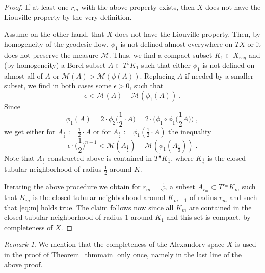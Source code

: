 \documentclass[12pt,leqno]{amsart}
\numberwithin{equation}{section}
\theoremstyle{definition}
\theoremstyle{remark}
\newtheorem{rem}[thm]{Remark}
\newcommand{\tref}[1]{Theorem~\ref{#1}}
\begin{document}
\begin{proof}
If at least one $r_m$ with the above property exists, then $X$  does not have the Liouville property by the very definition.

Assume on the other hand, that $X$ does not have the Liouville property. Then,  by homogeneity of the geodesic flow,  $\phi _1$ is not defined almost everywhere on $TX$ or it does not preserve the measure $\mathcal M$. Thus, we find a compact subset $K_1\subset X_{reg}$ and (by homogeneity) a Borel subset $A\subset T^1 K_1$ such that either $\phi_1$ is not defined on almost all of $A$ or $\mathcal M (A) > \mathcal M(\phi (A))$.  Replacing $A$
if needed by a smaller  subset, we find in both cases some $\epsilon >0$, such that   $$\epsilon < \mathcal M (A) - \mathcal M(\phi_1 (A)) \; .$$
Since $$\phi_1 (A)=2\cdot \phi _2 \Big (\frac 1 2 \cdot A \Big)=2\cdot \Big(\phi _1 \circ \phi_1 \Big (\frac 1 2 A \Big ) \Big ) \; ,$$
we get either for $A_{\frac 1 2} := \frac 1 2  \cdot A$ or for $A_{\frac 1 2} := \phi_1 (\frac 1 2 \cdot A)$ the inequality
$$\epsilon \cdot \Big(\frac 1 2 \Big )^{n+1}  < \mathcal M (A _{\frac 1 2}) - \mathcal M(\phi_1 (A _{\frac 1 2})) \; .$$
Note that $A_{\frac 1 2}$ constructed above is contained in $T^{\frac 1 2} K_{\frac 1 2}$, where $K _{\frac 1 2}$ is the closed tubular neighborhood  of
radius $\frac 1 2$ around $K$.

Iterating the above procedure we obtain  for $r_m =\frac 1 {2^m}$   a subset $A_{r_m} \subset T^{r_m} K_m$  such that $K_m$ is the closed tubular neighborhood around $K_{m-1}$ of radius $r_m$ and such that \eqref{eq:m} holds true.  The claim follows now since all $K_m$ are contained in the closed tubular neighborhood of radius $1$ around $K_1$ and this set is compact, by completeness of $X$.
\end{proof}


\begin{rem}
We mention that the completeness of the Alexandorv space $X$ is used in the proof of \tref{thmmain} only once, namely in the last line of the above proof.
\end{rem}
\end{document}
